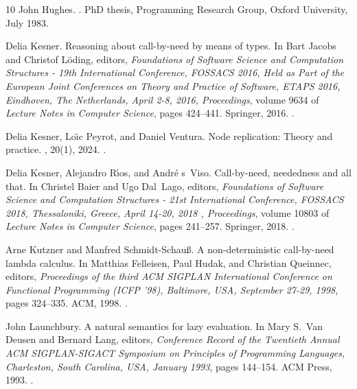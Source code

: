 \begin{thebibliography}{10}
John Hughes.
.
\newblock PhD thesis, Programming Research Group, Oxford University, July 1983.

Delia Kesner.
\newblock Reasoning about call-by-need by means of types.
\newblock In Bart Jacobs and Christof L{\"{o}}ding, editors, {\em Foundations
  of Software Science and Computation Structures - 19th International
  Conference, {FOSSACS } 2016, Held as Part of the European Joint Conferences
  on Theory and Practice of Software, { ETAPS} 2016, Eindhoven, The
  Netherlands, April 2-8, 2016, Proceedings}, volume 9634 of {\em Lecture Notes
  in Computer Science}, pages 424--441. Springer, 2016.
\newblock \href {https://doi.org/10.1007/978-3-662-49630-5\_25}
  {}.

Delia Kesner, Lo{\"{\i}}c Peyrot, and Daniel Ventura.
\newblock Node replication: Theory and practice.
, 20(1), 2024.
\newblock \href {https://doi.org/10.46298/LMCS-20(1:5)2024}
  {}.

Delia Kesner, Alejandro R{\'{\i}}os, and Andr{\'{e}} s~Viso.
\newblock Call-by-need, neededness and all that.
\newblock In Christel Baier and Ugo Dal~Lago, editors, {\em Foundations of
  Software Science and Computation Structures - 21st International Conference,
  {FOSSACS } 2018, Thessaloniki, Greece, April 14-20, 2018 , Proceedings},
  volume 10803 of {\em Lecture Notes in Computer Science}, pages 241--257.
  Springer, 2018.
\newblock \href {https://doi.org/10.1007/978-3-319-89366-2\_13}
  {}.

Arne Kutzner and Manfred Schmidt{-}Schau{\ss}.
\newblock A non-deterministic call-by-need lambda calculus.
\newblock In Matthias Felleisen, Paul Hudak, and Christian Queinnec, editors,
  {\em Proceedings of the third {ACM} {SIGPLAN} International Conference on
  Functional Programming {(ICFP} '98), Baltimore, USA, September 27-29, 1998},
  pages 324--335. {ACM}, 1998.
\newblock \href {https://doi.org/10.1145/289423.289462}
  {}.

John Launchbury.
\newblock A natural semantics for lazy evaluation.
\newblock In Mary S.~Van Deusen and Bernard Lang, editors, {\em Conference
  Record of the Twentieth Annual {ACM} { SIGPLAN-SIGACT} Symposium on
  Principles of Programming Languages, Charleston, South Carolina, USA, January
  1993}, pages 144--154. {ACM} Press, 1993.
\newblock \href {https://doi.org/10.1145/158511.158618}
  {}.


\end{thebibliography}
